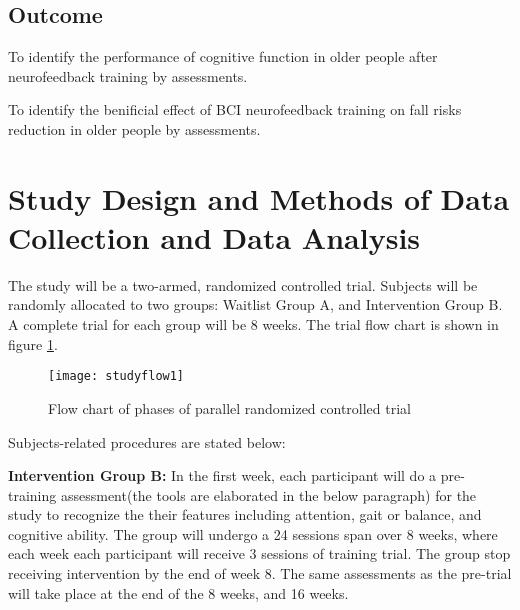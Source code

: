 \documentclass{article}
\begin{document}
\subsection{Outcome}
\begin{comment}
Aim: To outline potential broad outcomes for the study which will reflect the research question aim(s).
\end{comment}
\begin{description}[font=$\bullet$~\normalfont\textbf]
\item To identify the performance of cognitive function in older people after neurofeedback training by assessments.
\item To identify the benificial effect of BCI neurofeedback training on fall risks reduction in older people by assessments.
\end{description}

\section{Study Design and Methods of Data Collection and Data Analysis}
\begin{comment}
Aim: To describe the study design. To clearly describe the data collection methods and outline the roles involved in data collection. To clearly describe the data analysis methods.
\end{comment}

The study will be a two-armed, randomized controlled trial. Subjects will be randomly allocated to two groups: Waitlist Group A, and Intervention Group B. A complete trial for each group will be 8 weeks. The trial flow chart is shown in figure \ref{fig:studyflow1}.

\begin{figure}[!ht]
	\texttt{[image: studyflow1]}
	\centering
    \caption{Flow chart of phases of parallel randomized controlled trial}
    \label{fig:studyflow1}
\end{figure}

Subjects-related procedures are stated below:


\textbf{Intervention Group B:}
In the first week, each participant will do a pre-training assessment(the  tools are elaborated in the below paragraph) for the study to recognize the their features including attention, gait or balance, and cognitive ability. The group will undergo a 24 sessions span over 8 weeks, where each week each participant will receive 3 sessions of training trial. The group stop receiving intervention by the end of week 8. The same assessments as the pre-trial will take place at the end of the 8 weeks, and 16 weeks.
\end{document}
